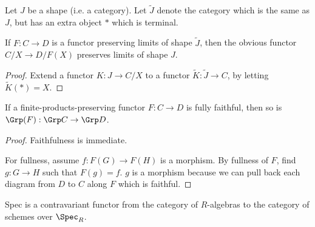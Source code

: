\begin{proposition}
  \label{0-over-lim}
  \uses{}
  \leanok
  Let $J$ be a shape (i.e. a category). Let $\widetilde J$ denote the category which is the same as $J$, but has an extra object $*$ which is terminal.

  If $F : C \to D$ is a functor preserving limits of shape $\widetilde J$, then the obvious functor $C / X \to D / F(X)$ preserves limits of shape $J$.
\end{proposition}
\begin{proof}
  \uses{}
  \leanok

  Extend a functor $K\colon  J \to C / X$ to a functor $\widetilde K\colon \widetilde J \to C$, by letting $\widetilde K (*) = X$.
\end{proof}


\begin{proposition}
  \label{0-full-faithful-grp}
  \uses{}
  \leanok

  If a finite-products-preserving functor $F : C \to D$ is fully faithful, then so is $\Grp(F) : \Grp C \to \Grp D$.
\end{proposition}
\begin{proof}
  \uses{}
  \leanok

  Faithfulness is immediate.

  For fullness, assume $f : F(G) \to F(H)$ is a morphism. By fullness of $F$, find $g : G \to H$ such that $F(g) = f$. $g$ is a morphism because we can pull back each diagram from $D$ to $C$ along $F$ which is faithful.
\end{proof}


\begin{definition}
  \label{0-spec-alg}
  \uses{}
  \leanok

  Spec is a contravariant functor from the category of $R$-algebras to the category of schemes over $\Spec_R$.
\end{definition}


